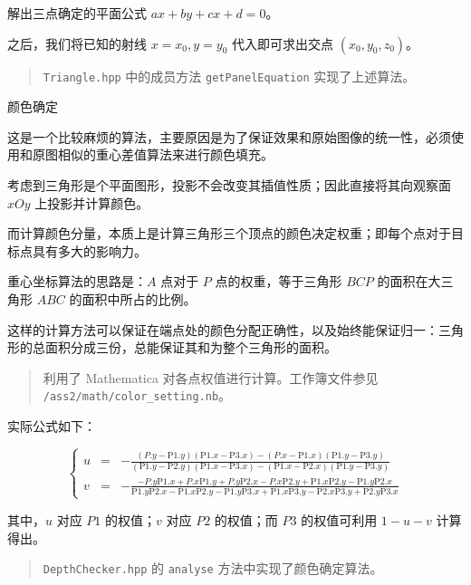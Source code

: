 \documentclass[
]{article}
\begin{document}
解出三点确定的平面公式 \(ax + by + cx + d = 0\)。

之后，我们将已知的射线 \(x = x_0, y = y_0\) 代入即可求出交点
\((x_0, y_0, z_0)\)。

\begin{quote}
\texttt{Triangle.hpp} 中的成员方法 \texttt{getPanelEquation}
实现了上述算法。
\end{quote}

颜色确定

这是一个比较麻烦的算法，主要原因是为了保证效果和原始图像的统一性，必须使用和原图相似的重心差值算法来进行颜色填充。

考虑到三角形是个平面图形，投影不会改变其插值性质；因此直接将其向观察面
\(xOy\) 上投影并计算颜色。

而计算颜色分量，本质上是计算三角形三个顶点的颜色决定权重；即每个点对于目标点具有多大的影响力。

重心坐标算法的思路是：\(A\) 点对于 \(P\) 点的权重，等于三角形 \(BCP\)
的面积在大三角形 \(ABC\) 的面积中所占的比例。

这样的计算方法可以保证在端点处的颜色分配正确性，以及始终能保证归一：三角形的总面积分成三份，总能保证其和为整个三角形的面积。

\begin{quote}
利用了 Mathematica 对各点权值进行计算。工作簿文件参见
\texttt{/ass2/math/color\_setting.nb}。
\end{quote}

实际公式如下：

\[\left\{
\begin{aligned}
u & = & -\frac{(P.y-\text{P1}.y) (\text{P1}.x-\text{P3}.x)-(P.x-\text{P1}.x) (\text{P1}.y-\text{P3}.y)}{(\text{P1}.y-\text{P2}.y) (\text{P1}.x-\text{P3}.x)-(\text{P1}.x-\text{P2}.x) (\text{P1}.y-\text{P3}.y)} \\

v & = & -\frac{-P.y \text{P1}.x+P.x \text{P1}.y+P.y \text{P2}.x-P.x \text{P2}.y+\text{P1}.x \text{P2}.y-\text{P1}.y \text{P2}.x}{\text{P1}.y \text{P2}.x-\text{P1}.x \text{P2}.y-\text{P1}.y \text{P3}.x+\text{P1}.x \text{P3}.y-\text{P2}.x \text{P3}.y+\text{P2}.y \text{P3}.x}

\end{aligned}
\right.\]

其中，\(u\) 对应 \(P1\) 的权值；\(v\) 对应 \(P2\) 的权值；而 \(P3\)
的权值可利用 \(1 - u - v\) 计算得出。

\begin{quote}
\texttt{DepthChecker.hpp} 的 \texttt{analyse} 方法中实现了颜色确定算法。
\end{quote}
\end{document}
